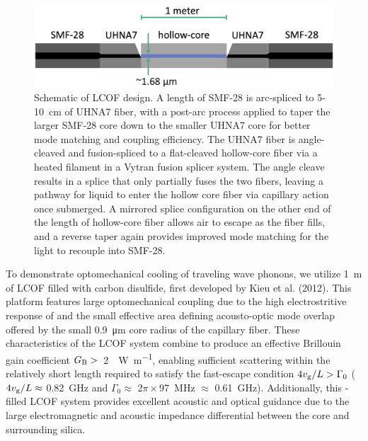 \begin{figure}[t]
  \centering
  \includegraphics[width=\textwidth]{figs/2-Cooling/LCOFdiagram.png}
  \caption[Schematic of \ac{LCOF} design.]{Schematic of \ac{LCOF} design. A length of \ac{SMF-28} is arc-spliced to 5-\SI{10}{\centi\meter} of \ac{UHNA7} fiber, with a post-arc process applied to taper the larger \ac{SMF-28} core down to the smaller \ac{UHNA7} core for better mode matching and coupling efficiency. The \ac{UHNA7} fiber is angle-cleaved and fusion-spliced to a flat-cleaved hollow-core fiber via a heated filament in a Vytran fusion splicer system. The angle cleave results in a splice that only partially fuses the two fibers, leaving a pathway for liquid to enter the hollow core fiber via capillary action once submerged. A mirrored splice configuration on the other end of the length of hollow-core fiber allows air to escape as the fiber fills, and a reverse taper again provides improved mode matching for the light to recouple into \ac{SMF-28}.}
  \label{fig:LCOF diagram}
\end{figure}

To demonstrate optomechanical cooling of traveling wave phonons, we utilize \SI{1}{\meter} of \acl{LCOF} filled with carbon disulfide, first developed by Kieu et al. (2012). \cite{kieu2012integrated} This platform features large optomechanical coupling due to the high electrostritive response of  \cite{boyd2020nonlinear} and the small effective area defining acousto-optic mode overlap offered by the small \SI{0.9}{\micro\meter} core radius of the capillary fiber. These characteristics of the \ac{LCOF} system combine to produce an effective Brillouin gain coefficient \(G_{\rm B} >\)~\SI{2}{\per\watt\per\meter}, enabling sufficient scattering within the relatively short length required to satisfy the fast-escape condition \(4v_{\rm g}/L > \Gamma_{0}\) (\(4v_{\rm g}/L \approx\) \SI{0.82}{\giga\hertz} and \(\Gamma_{0} \approx\) 2\(\pi\times\)\SI{97}{\mega\hertz} \(\approx\) \SI{0.61}{\giga\hertz}). \cite{johnson2023laser} Additionally, this -filled \ac{LCOF} system provides excellent acoustic and optical guidance due to the large electromagnetic and acoustic impedance differential between the  core and surrounding silica. \cite{behunin2019spontaneous}

